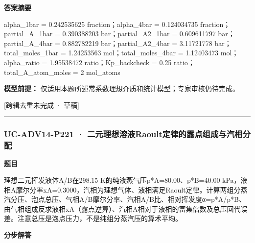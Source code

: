 \documentclass[UTF8,11pt,a4paper]{ctexart}
\begin{document}
\noindent\textbf{答案摘要}\par
alpha\_1bar = 0.242535625 fraction；alpha\_4bar = 0.124034735 fraction；partial\_A\_1bar = 0.390388203 bar；partial\_A2\_1bar = 0.609611797 bar；partial\_A\_4bar = 0.882782219 bar；partial\_A2\_4bar = 3.11721778 bar；total\_moles\_1bar = 1.24253563 mol；total\_moles\_4bar = 1.12403473 mol；alpha\_ratio = 1.95538472 ratio；Kp\_backcheck = 0.25 ratio；total\_A\_atom\_moles = 2 mol\_atoms\par
\noindent\textbf{模型前提：}
仅适用本题所述常系数理想介质和统计模型；专家审核仍待完成。\par
\noindent\textcolor{red!65!black}{[跨辑去重未完成 · 草稿]} \par
\medskip\hrule\medskip
{}
\subsubsection*{UC-ADV14-P221 · 二元理想溶液Raoult定律的露点组成与汽相分配}
\noindent\textbf{题目}\par
理想二元挥发液体A/B在298.15 K的纯液蒸气压p*A=80.00、p*B=40.00 kPa，液相A摩尔分率xA=0.3000，汽相为理想气体、液相满足Raoult定律。计算两组分蒸汽分压、泡点总压、气相A/B摩尔分率、汽相A/B比、相对挥发度α=p*A/p*B、由气相组成反求液相xA（露点逆算）、汽相A相对于液相的富集倍数及总压回代误差。注意总压是泡点压力，不是纯组分蒸汽压的算术平均。\par
\medskip\noindent\textbf{分步解答}
\end{document}
